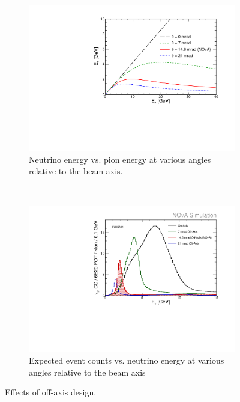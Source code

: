 \begin{figure}[t]
\centering
\begin{subfigure}[c]{0.47\textwidth}
                \centering
                \includegraphics[width=\textwidth]{figures/plots/nova/EnuVSEpi_NOvA-0-7-21.pdf}
                \caption{Neutrino energy vs. pion energy at various angles relative to the beam axis.}
                 \label{EnuEpi}
        \end{subfigure}
        ~
\begin{subfigure}[c]{0.47\textwidth}
                \centering
                \includegraphics[width=\textwidth]{figures/plots/nova/spectrum_FD_NOvA-0-7-21.pdf}
                \caption{Expected \numu event counts vs. neutrino energy at various angles relative to the beam axis}
                \label{fluxEnu}

        \end{subfigure}
        \caption{Effects of off-axis design.}
\end{figure}
 

